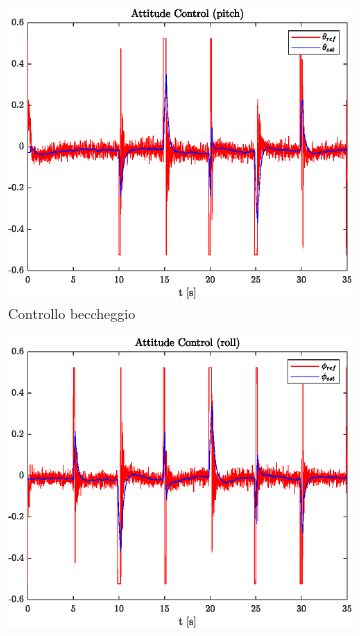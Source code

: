 \begin{figure}
	\centering
	\begin{subfigure}{0.45\textwidth}
		\centering
		\includegraphics[width=1\textwidth]{Simulazioni/Figure/PID/SQUARE/AttitudeControlPitch}
		\caption{Controllo beccheggio}
	\end{subfigure}
	\hfill
	\begin{subfigure}{0.45\textwidth}
		\centering
		\includegraphics[width=1\textwidth]{Simulazioni/Figure/PID/SQUARE/AttitudeControlRoll}

\end{subfigure}
\end{figure}
